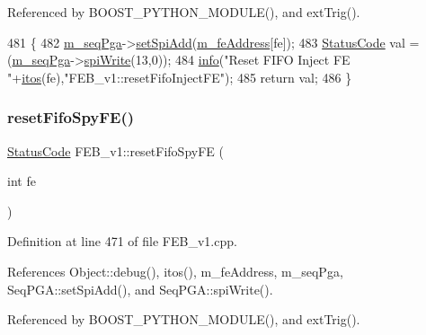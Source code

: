 Referenced by B\+O\+O\+S\+T\+\_\+\+P\+Y\+T\+H\+O\+N\+\_\+\+M\+O\+D\+U\+L\+E(), and ext\+Trig().


\begin{DoxyCode}
481                                           \{  
482   \hyperlink{classFEB__v1_a6c7804ac86796f233a8393043adf2e77}{m\_seqPga}->\hyperlink{classSeqPGA_ac998ce3a6d9b5f2e88cc8393f8c1df53}{setSpiAdd}(\hyperlink{classFEB__v1_a4e1945c2d5b434125f375e9d0fc6d99f}{m\_feAddress}[fe]);
483   \hyperlink{classStatusCode}{StatusCode} val = (\hyperlink{classFEB__v1_a6c7804ac86796f233a8393043adf2e77}{m\_seqPga}->\hyperlink{classSeqPGA_ad4421841ce4ce8b88ad13f63216f0743}{spiWrite}(13,0));
484   \hyperlink{classObject_a644fd329ea4cb85f54fa6846484b84a8}{info}(\textcolor{stringliteral}{"Reset FIFO Inject FE "}+\hyperlink{Tools_8h_af330027dbdafb9a30768b3613c553e60}{itos}(fe),\textcolor{stringliteral}{"FEB\_v1::resetFifoInjectFE"});
485   \textcolor{keywordflow}{return} val;
486 \}
\end{DoxyCode}
\mbox{\label{classFEB__v1_ab02c292e29e01079bb9b268acbc782b1}} 
\subsubsection{\texorpdfstring{reset\+Fifo\+Spy\+F\+E()}{resetFifoSpyFE()}}
{\footnotesize\ttfamily \hyperlink{classStatusCode}{Status\+Code} F\+E\+B\+\_\+v1\+::reset\+Fifo\+Spy\+FE (\begin{DoxyParamCaption}\item[{int}]{fe }\end{DoxyParamCaption})}



Definition at line 471 of file F\+E\+B\+\_\+v1.\+cpp.



References Object\+::debug(), itos(), m\+\_\+fe\+Address, m\+\_\+seq\+Pga, Seq\+P\+G\+A\+::set\+Spi\+Add(), and Seq\+P\+G\+A\+::spi\+Write().



Referenced by B\+O\+O\+S\+T\+\_\+\+P\+Y\+T\+H\+O\+N\+\_\+\+M\+O\+D\+U\+L\+E(), and ext\+Trig().


